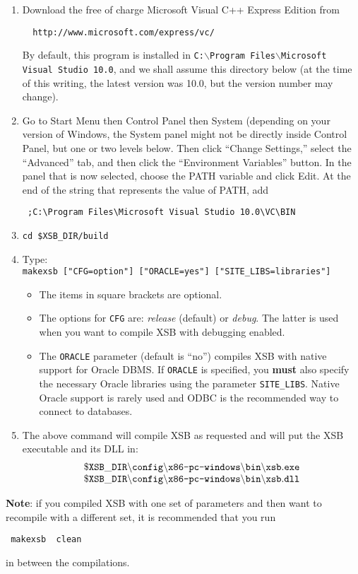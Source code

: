\begin{enumerate}
\item Download the free of charge Microsoft Visual C++ Express Edition from
\begin{verbatim}
  http://www.microsoft.com/express/vc/ 
\end{verbatim}
By default, this program is installed in
\texttt{C:$\backslash$Program Files$\backslash$Microsoft Visual Studio 10.0},
and we shall assume this
directory below (at the time of this writing, the latest version was 10.0,
but the version number may change).
\item Go to Start Menu then Control Panel then System (depending on your
version of Windows, the System panel might not be directly inside Control
Panel, but one or two levels below. Then click ``Change Settings,'' select
the ``Advanced'' tab, and then click the ``Environment Variables'' button.
In the panel that is now selected,
choose the PATH variable and click Edit. At the end of the string that
represents the value of PATH, add
\begin{verbatim}
 ;C:\Program Files\Microsoft Visual Studio 10.0\VC\BIN
\end{verbatim}

\item
   {\tt cd \$XSB\_DIR/build}  
\item
  Type:\\
  {\tt makexsb ["CFG=option"] ["ORACLE=yes"] ["SITE\_LIBS=libraries"]}
  \begin{itemize}
  \item The items in square brackets are optional.
  \item The options for {\tt CFG} are: \emph{release} (default) or \emph{debug}.  The
    latter is used when you want to compile XSB with debugging enabled.
  \item The {\tt ORACLE} parameter (default is ``no'') compiles XSB with
    native support for Oracle DBMS. If {\tt ORACLE} is
    specified, you {\bf must} also specify the necessary Oracle libraries
    using the parameter {\tt SITE\_LIBS}.
    Native Oracle support is rarely used and ODBC is the recommended way to
    connect to databases.
  \end{itemize}
   
 \item The above command will compile XSB as requested and will put the XSB 
   executable and its DLL in:
\[
\begin{array}{l}
 \tt
 \$XSB\_DIR\backslash{}config\backslash\texttt{x86-pc-windows}\backslash{}bin\backslash{}xsb.exe
\\
 \tt
 \$XSB\_DIR\backslash{}config\backslash\texttt{x86-pc-windows}\backslash{}bin\backslash{}xsb.dll
 \end{array}
\]
\end{enumerate}
{\bf Note}: if you compiled XSB with one set of parameters and then want to
recompile with a different set, it is recommended that you run
\begin{verbatim}
 makexsb  clean  
\end{verbatim}
in between the compilations.


